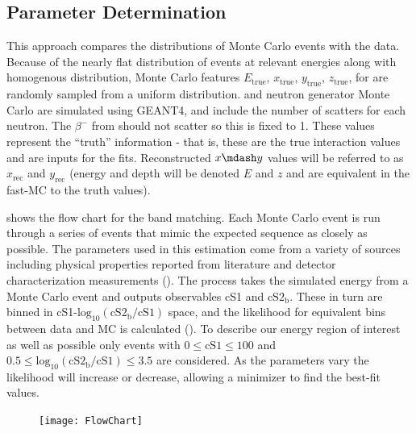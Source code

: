 \subsection{Parameter Determination}
\label{subsec:er_nr_calibrations_parameter_determ}
This approach compares the distributions of Monte Carlo events with the data.  Because of the nearly flat distribution of events at
relevant
energies along with homogenous distribution, Monte Carlo features $E_{\mathrm{true}}$, $x_{\mathrm{true}}$, $y_{\mathrm{true}}$,
$z_{\mathrm{true}}$, for  are randomly sampled from a
uniform distribution.   and neutron generator Monte Carlo are simulated using GEANT4, and include the number of
scatters for each neutron.  The $\beta^-$ from  should not scatter so this is fixed to 1.  These values represent the
``truth'' information - that is, these are the true interaction values and are inputs for the fits.  Reconstructed $x \mdash y$ values
will be referred to as $x_{\mathrm{rec}}$
and $y_{\mathrm{rec}}$ (energy and depth will be denoted $E$ and $z$ and are equivalent in the fast-MC to the truth values).

 shows the flow chart for the band matching.  Each Monte Carlo event is run
through a series of events that mimic the expected sequence as closely as possible.  The parameters used in this estimation come from
a variety of sources including physical properties reported from literature and detector characterization measurements
().  The process takes the simulated energy from a Monte Carlo event and outputs observables cS1 and
$\mathrm{cS2_b}$.  These in turn are binned in cS1-$\mathrm{log_{10}(cS2_b / cS1)}$ space, and the likelihood for equivalent bins
between data and MC is calculated ().  To describe our energy region of
interest as well as possible only events with $0 \leq \mathrm{cS1} \leq 100$ and $0.5 \leq \mathrm{log_{10}(cS2_b / cS1)} \leq 3.5$ are
considered.  As the parameters vary the likelihood will increase or decrease, allowing a minimizer to find the best-fit values.

\begin{figure}
\centering
\texttt{[image: FlowChart]}
\label{fig:er_nr_calibrations_parameter_determ_flow_chart}
\end{figure}

